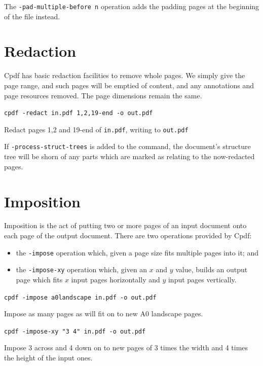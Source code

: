 \documentclass{book}
\begin{document}
\noindent The \texttt{-pad-multiple-before n} operation adds the padding pages at the beginning of the file  instead.

\section{Redaction}

Cpdf has basic redaction facilities to remove whole pages. We simply give the page range, and such pages will be emptied of content, and any annotations and page resources removed. The page dimensions remain the same.

  \begin{framed}
    \noindent\small\verb!cpdf -redact in.pdf 1,2,19-end -o out.pdf!
 
    \vspace{2.5mm}
    \noindent Redact pages 1,2 and 19-end of \texttt{in.pdf}, writing to \texttt{out.pdf}
  \end{framed}

\noindent If \texttt{-process-struct-trees} is added to the command, the document's structure tree will be shorn of any parts which are marked as relating to the now-redacted pages.

\section{Imposition}


Imposition is the act of putting two or more pages of an input document onto each page of the output document. There are two operations provided by Cpdf:

\begin{itemize}
\item the \texttt{-impose} operation which, given a page size fits multiple pages into it; and
\item the \texttt{-impose-xy} operation which, given an $x$ and $y$ value, builds an output page which fits $x$ input pages horizontally and $y$ input pages vertically. \end{itemize}

  \begin{framed}
    \noindent\small\verb!cpdf -impose a0landscape in.pdf -o out.pdf!
 
    \vspace{2.5mm}
    \noindent Impose as many pages as will fit on to new A0 landscape pages. 

    \vspace{2.5mm}
    \noindent\small\verb!cpdf -impose-xy "3 4" in.pdf -o out.pdf!
 
    \vspace{2.5mm}
    \noindent Impose 3 across and 4 down on to new pages of 3 times the width and 4 times the height of the input ones. 
  \end{framed}
\end{document}

